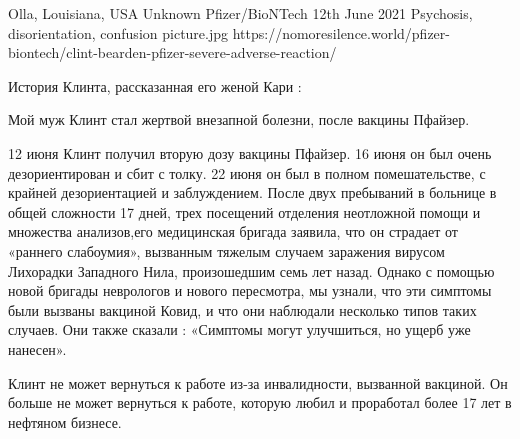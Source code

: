 {Olla, Louisiana, USA}
{Unknown}
{Pfizer/BioNTech}
{12th June 2021}
{Psychosis, disorientation, confusion}
{picture.jpg}
{https://nomoresilence.world/pfizer-biontech/clint-bearden-pfizer-severe-adverse-reaction/}
{
История Клинта, рассказанная его женой Кари :

Мой муж Клинт стал жертвой внезапной болезни, после  вакцины Пфайзер.

12 июня Клинт получил вторую дозу вакцины Пфайзер. 16 июня он был очень
дезориентирован и сбит с толку. 22 июня он был в полном помешательстве, с
крайней дезориентацией и заблуждением. После двух пребываний в больнице в общей
сложности 17 дней, трех посещений отделения неотложной помощи и множества
анализов,его медицинская бригада заявила, что он страдает от «раннего
слабоумия», вызванным тяжелым случаем заражения вирусом Лихорадки Западного
Нила, произошедшим семь лет назад. Однако с помощью новой бригады неврологов и
нового пересмотра, мы узнали, что эти симптомы были вызваны вакциной Ковид, и
что они наблюдали несколько типов таких случаев. Они также сказали : «Симптомы
могут улучшиться, но ущерб уже нанесен».

Клинт не может вернуться к работе из-за инвалидности, вызванной вакциной. Он
больше не может вернуться к работе, которую любил и проработал более 17 лет в
нефтяном бизнесе.

}
